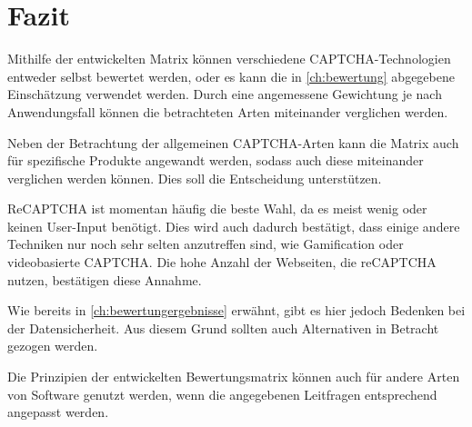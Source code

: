 \chapter{Fazit}

Mithilfe der entwickelten Matrix können verschiedene CAPTCHA-Techno\-logien entweder selbst bewertet werden,
oder es kann die in \autoref{ch:bewertung} abgegebene Einschätzung verwendet werden.
Durch eine angemessene Gewichtung je nach Anwendungsfall können die betrachteten Arten miteinander verglichen werden.

Neben der Betrachtung der allgemeinen CAPTCHA-Arten kann die Matrix auch für spezifische Produkte angewandt werden,
sodass auch diese miteinander verglichen werden können.
Dies soll die Entscheidung unterstützen.

ReCAPTCHA ist momentan häufig die beste Wahl, da es meist wenig oder keinen User-Input benötigt.
Dies wird auch dadurch bestätigt, dass einige andere Techniken nur noch sehr selten anzutreffen sind,
wie Gamification oder videobasierte CAPTCHA. 
Die hohe Anzahl der Webseiten, die reCAPTCHA nutzen, bestätigen diese Annahme. \cite{stats}

Wie bereits in \autoref{ch:bewertungergebnisse} erwähnt, gibt es hier jedoch Bedenken bei der Datensicherheit.
Aus diesem Grund sollten auch Alternativen in Betracht gezogen werden. 

Die Prinzipien der entwickelten Bewertungsmatrix können auch für andere Arten von Software genutzt werden,
wenn die angegebenen Leitfragen entsprechend angepasst werden. 